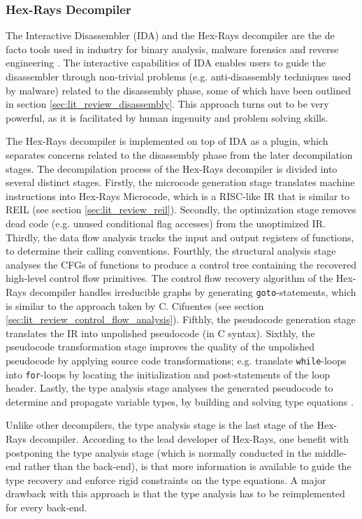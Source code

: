 
\subsubsection{Hex-Rays Decompiler}
\label{sec:rel_work_hex-rays_decompiler}

The Interactive Disassembler (IDA) and the Hex-Rays decompiler are the de facto tools used in industry for binary analysis, malware forensics and reverse engineering \cite{semantics_preserving_structural_analysis}. The interactive capabilities of IDA enables users to guide the disassembler through non-trivial problems (e.g. anti-disassembly techniques used by malware) related to the disassembly phase, some of which have been outlined in section \ref{sec:lit_review_disassembly}. This approach turns out to be very powerful, as it is facilitated by human ingenuity and problem solving skills.

The Hex-Rays decompiler is implemented on top of IDA as a plugin, which separates concerns related to the disassembly phase from the later decompilation stages. The decompilation process of the Hex-Rays decompiler is divided into several distinct stages. Firstly, the microcode generation stage translates machine instructions into Hex-Rays Microcode, which is a RISC-like IR that is similar to REIL (see section \ref{sec:lit_review_reil}). Secondly, the optimization stage removes dead code (e.g. unused conditional flag accesses) from the unoptimized IR. Thirdly, the data flow analysis tracks the input and output registers of functions, to determine their calling conventions. Fourthly, the structural analysis stage analyses the CFGs of functions to produce a control tree containing the recovered high-level control flow primitives. The control flow recovery algorithm of the Hex-Rays decompiler handles irreducible graphs by generating \texttt{goto}-statements, which is similar to the approach taken by C. Cifuentes (see section \ref{sec:lit_review_control_flow_analysis}). Fifthly, the pseudocode generation stage translates the IR into unpolished pseudocode (in C syntax).  Sixthly, the pseudocode transformation stage improves the quality of the unpolished pseudocode by applying source code transformations; e.g. translate \texttt{while}-loops into \texttt{for}-loops by locating the initialization and post-statements of the loop header. Lastly, the type analysis stage analyses the generated pseudocode to determine and propagate variable types, by building and solving type equations \cite{hexrays}.

Unlike other decompilers, the type analysis stage is the last stage of the Hex-Rays decompiler. According to the lead developer of Hex-Rays, one benefit with postponing the type analysis stage (which is normally conducted in the middle-end rather than the back-end), is that more information is available to guide the type recovery and enforce rigid constraints on the type equations. A major drawback with this approach is that the type analysis has to be reimplemented for every back-end.
